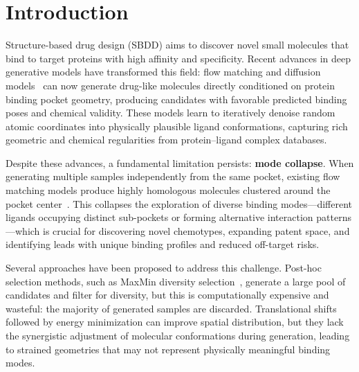 \documentclass[a4paper,11pt]{article}
\begin{document}
\begin{abstract}
\textbf{Key insight}: Through systematic ablation studies, we discovered that
initially designed geometric constraints (tangent-plane projection and orthogonal
kinetic protection) actually \textbf{suppress spatial diversity}.  Removing these
constraints---pure SVGD repulsion with time annealing---restores full exploration
capability while maintaining chemical integrity.  This ``Less is More'' principle
provides a concise design principle for inference-time guidance.

SV-Flow adds minimal overhead ($\approx 0.2$ s/molecule for SVGD repulsion) and
requires no retraining.  The framework is model-agnostic and can be readily
applied to any flow-matching or diffusion-based SBDD pipeline.
\end{abstract}

\section{Introduction}

Structure-based drug design (SBDD) aims to discover novel small molecules that
bind to target proteins with high affinity and specificity.  Recent advances in
deep generative models have transformed this field: flow matching and diffusion
models~\cite{guan2023targetdiff,schneuing2024diffsbdd,drugflow2024,zhang2024flag}
can now generate drug-like molecules directly conditioned on protein binding
pocket geometry, producing candidates with favorable predicted binding poses and
chemical validity.  These models learn to iteratively denoise random atomic
coordinates into physically plausible ligand conformations, capturing rich
geometric and chemical regularities from protein--ligand complex databases.

Despite these advances, a fundamental limitation persists: \textbf{mode
collapse}.  When generating multiple samples independently from the same pocket,
existing flow matching models produce highly homologous molecules clustered
around the pocket center~\cite{guan2023decomp}.  This collapses the exploration
of diverse binding modes---different ligands occupying distinct sub-pockets or
forming alternative interaction patterns---which is crucial for discovering novel
chemotypes, expanding patent space, and identifying leads with unique binding
profiles and reduced off-target risks.

Several approaches have been proposed to address this challenge.  Post-hoc
selection methods, such as MaxMin diversity selection~\cite{maxmin}, generate a
large pool of candidates and filter for diversity, but this is computationally
expensive and wasteful: the majority of generated samples are discarded.
Translational shifts followed by energy minimization can improve spatial
distribution, but they lack the synergistic adjustment of molecular conformations
during generation, leading to strained geometries that may not represent
physically meaningful binding modes.
\end{document}
